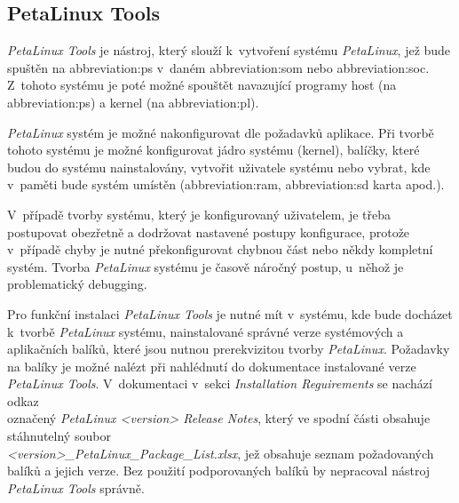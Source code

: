 \documentclass[a4paper, twoside, 11pt]{article}
\begin{document}
		\subsection{PetaLinux Tools}\label{subsec:petalinux-tools}
			\textit{PetaLinux Tools} je nástroj, který slouží k~vytvoření systému \textit{PetaLinux}, jež bude spuštěn na \gls{abbreviation:ps} v~daném \gls{abbreviation:som} nebo \gls{abbreviation:soc}. Z~tohoto systému je poté možné spouštět navazující programy host (na \gls{abbreviation:ps}) a kernel (na \gls{abbreviation:pl}).\par
			\textit{PetaLinux} systém je možné nakonfigurovat dle požadavků aplikace. Při tvorbě tohoto systému je možné konfigurovat jádro systému (kernel), balíčky, které budou do systému nainstalovány, vytvořit uživatele systému nebo vybrat, kde v~paměti bude systém umístěn (\gls{abbreviation:ram}, \gls{abbreviation:sd} karta apod.). \cite{xilinx-petalinux}\par
			V~případě tvorby systému, který je konfigurovaný uživatelem, je třeba postupovat obezřetně a dodržovat nastavené postupy konfigurace, protože v~případě chyby je nutné překonfigurovat chybnou část nebo někdy kompletní systém. Tvorba \textit{PetaLinux} systému je časově náročný postup, u~něhož je problematický debugging.\par
			Pro funkční instalaci \textit{PetaLinux Tools} je nutné mít v~systému, kde bude docházet k~tvorbě \textit{PetaLinux} systému, nainstalované správné verze systémových a aplikačních balíků, které jsou nutnou prerekvizitou tvorby \textit{PetaLinux}. Požadavky na balíky je možné nalézt při nahlédnutí do dokumentace \cite{petalinux-tools-documentation-2022} instalované verze \textit{PetaLinux Tools}. V~dokumentaci v~sekci \textit{Installation Reguirements} se nachází odkaz\\označený \textit{PetaLinux <version> Release Notes}, který ve spodní části obsahuje stáhnutelný soubor\\\textit{<version>\_PetaLinux\_Package\_List.xlsx}, jež obsahuje seznam požadovaných balíků a jejich verze. Bez použití podporovaných balíků by nepracoval nástroj \textit{PetaLinux Tools} správně.
\end{document}
